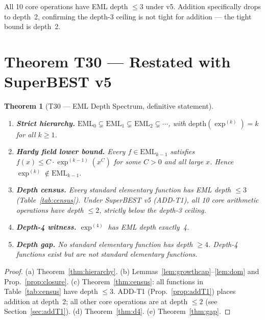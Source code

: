 \documentclass[12pt,a4paper]{article}
\newtheorem{theorem}{Theorem}[section]
\theoremstyle{definition}
\theoremstyle{remark}
\begin{document}
All 10 core operations have EML depth $\leq 3$ under v5.
Addition specifically drops to depth~2, confirming the depth-3 ceiling is not tight
for addition --- the tight bound is depth~2.

\section{Theorem T30 --- Restated with SuperBEST v5}
\label{sec:T30}

\begin{theorem}[T30 --- EML Depth Spectrum, definitive statement]\label{thm:T30}
\mbox{}
\begin{enumerate}
  \item[\textbf{(a)}] \textbf{Strict hierarchy.}
        $\mathrm{EML}_0 \subsetneq \mathrm{EML}_1 \subsetneq \mathrm{EML}_2 \subsetneq \cdots$,
        with $\mathrm{depth}(\exp^{(k)}) = k$ for all $k \geq 1$.

  \item[\textbf{(b)}] \textbf{Hardy field lower bound.}
        Every $f \in \mathrm{EML}_{k-1}$ satisfies
        $f(x) \leq C \cdot \exp^{(k-1)}(x^C)$ for some $C > 0$ and all large $x$.
        Hence $\exp^{(k)} \notin \mathrm{EML}_{k-1}$.

  \item[\textbf{(c)}] \textbf{Depth census.}
        Every standard elementary function has EML depth $\leq 3$
        (Table~\ref{tab:census}).  Under SuperBEST v5 (ADD-T1), all 10 core
        arithmetic operations have depth $\leq 2$, strictly below the depth-3 ceiling.

  \item[\textbf{(d)}] \textbf{Depth-4 witness.}
        $\exp^{(4)}$ has EML depth exactly~4.

  \item[\textbf{(e)}] \textbf{Depth gap.}
        No standard elementary function has depth $\geq 4$.
        Depth-4 functions exist but are not standard elementary functions.
\end{enumerate}
\end{theorem}

\begin{proof}
(a) Theorem~\ref{thm:hierarchy}.
(b) Lemmas~\ref{lem:growthcap}--\ref{lem:dom} and Prop.~\ref{prop:closure}.
(c) Theorem~\ref{thm:census}: all functions in Table~\ref{tab:census} have depth $\leq 3$.
    ADD-T1 (Prop.~\ref{prop:addT1}) places addition at depth~2;
    all other core operations are at depth $\leq 2$ (see Section~\ref{sec:addT1}).
(d) Theorem~\ref{thm:d4}.
(e) Theorem~\ref{thm:gap}.
\end{proof}
\end{document}
